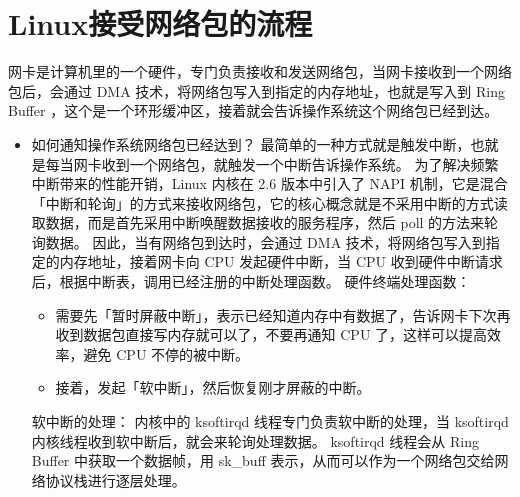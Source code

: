 \documentclass[11pt]{article}
\begin{document}
\section{Linux接受网络包的流程}
\label{sec:orgdf626e4}

网卡是计算机里的一个硬件，专门负责接收和发送网络包，当网卡接收到一个网络包后，会通过 DMA 技术，将网络包写入到指定的内存地址，也就是写入到 Ring Buffer ，这个是一个环形缓冲区，接着就会告诉操作系统这个网络包已经到达。

\begin{itemize}
\item 如何通知操作系统网络包已经达到？
最简单的一种方式就是触发中断，也就是每当网卡收到一个网络包，就触发一个中断告诉操作系统。
为了解决频繁中断带来的性能开销，Linux 内核在 2.6 版本中引入了 NAPI 机制，它是混合「中断和轮询」的方式来接收网络包，它的核心概念就是不采用中断的方式读取数据，而是首先采用中断唤醒数据接收的服务程序，然后 poll 的方法来轮询数据。
因此，当有网络包到达时，会通过 DMA 技术，将网络包写入到指定的内存地址，接着网卡向 CPU 发起硬件中断，当 CPU 收到硬件中断请求后，根据中断表，调用已经注册的中断处理函数。
硬件终端处理函数：
\begin{itemize}
\item 需要先「暂时屏蔽中断」，表示已经知道内存中有数据了，告诉网卡下次再收到数据包直接写内存就可以了，不要再通知 CPU 了，这样可以提高效率，避免 CPU 不停的被中断。
\item 接着，发起「软中断」，然后恢复刚才屏蔽的中断。
\end{itemize}
软中断的处理：
内核中的 ksoftirqd 线程专门负责软中断的处理，当 ksoftirqd 内核线程收到软中断后，就会来轮询处理数据。
ksoftirqd 线程会从 Ring Buffer 中获取一个数据帧，用 sk\_buff 表示，从而可以作为一个网络包交给网络协议栈进行逐层处理。
\end{itemize}
\end{document}
